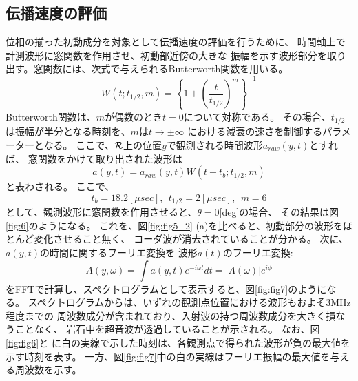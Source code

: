 \subsection{伝播速度の評価}
位相の揃った初動成分を対象として伝播速度の評価を行うために、
時間軸上で計測波形に窓関数を作用させ、初動部近傍の大きな
振幅を示す波形部分を取り出す。窓関数には、次式で与えられるButterworth関数を用いる。
\begin{equation}
	W(t;t_{1/2},m)=
	\left\{
		1+\left(\frac{t}{t_{1/2}}\right)^m
	\right\}^{-1}
	\label{eqn:Butterworth}
\end{equation}
Butterworth関数は、$m$が偶数のとき$t=0$について対称である。
その場合、$t_{1/2}$は振幅が半分となる時刻を、$m$は$t\rightarrow \pm \infty$
における減衰の速さを制御するパラメーターとなる。
ここで、$\cal R$上の位置$y$で観測される時間波形$a_{raw}(y,t)$とすれば、
窓関数をかけて取り出された波形は
\begin{equation}
	a(y,t)=a_{raw}(y,t)W(t-t_b;t_{1/2},m)
\end{equation}
と表わされる。
ここで、
\[
	t_b=18.2[\mu sec], \ \ t_{1/2}=2[\mu sec], \ \ m=6
\]
として、観測波形に窓関数を作用させると、$\theta=0$[deg]の場合、
その結果は図\ref{fig:6}のようになる。
これを、図\ref{fig:fig5_2}-(a)を比べると、初動部分の波形をほとんど変化させること無く、
コーダ波が消去されていることが分かる。
次に、$a(y,t)$の時間に関するフーリエ変換を
波形$a(t)$のフーリエ変換:
\begin{equation}
	A(y, \omega)=\int a(y, t)e^{-i\omega t}dt=\left| A(\omega) \right|e^{i\phi}
	\label{eqn:def_FFT}
\end{equation}
をFFTで計算し、スペクトログラムとして表示すると、図\ref{fig:fig7}のようになる。
スペクトログラムからは、いずれの観測点位置における波形もおよそ3MHz程度までの
周波数成分が含まれており、入射波の持つ周波数成分を大きく損なうことなく、
岩石中を超音波が透過していることが示される。
なお、図\ref{fig:fig6}と
に白の実線で示した時刻は、各観測点で得られた波形が負の最大値を示す時刻を表す。
一方、図\ref{fig:fig7}中の白の実線はフーリエ振幅の最大値を与える周波数を示す。


